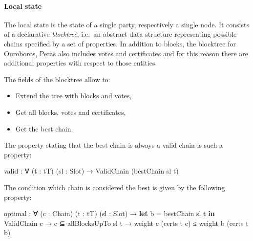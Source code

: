 \documentclass[10pt]{article}
\newenvironment{Shaded}{}{}
\newcommand{\KeywordTok}[1]{\textcolor[rgb]{0.00,0.44,0.13}{\textbf{#1}}}
\newcommand{\NormalTok}[1]{#1}
\newcommand{\OtherTok}[1]{\textcolor[rgb]{0.00,0.44,0.13}{#1}}
\providecommand{\tightlist}{%
  \setlength{\itemsep}{0pt}\setlength{\parskip}{0pt}}
\begin{document}
\paragraph{Local state}\label{local-state}

The local state is the state of a single party, respectively a single
node. It consists of a declarative \emph{blocktree}, i.e.~an abstract
data structure representing possible chains specified by a set of
properties. In addition to blocks, the blocktree for Ouroboros, Peras
also includes votes and certificates and for this reason there are
additional properties with respect to those entities.

The fields of the blocktree allow to:

\begin{itemize}
\tightlist
\item
  Extend the tree with blocks and votes,
\item
  Get all blocks, votes and certificates,
\item
  Get the best chain.
\end{itemize}

The property stating that the best chain is always a valid chain is such
a property:

\begin{Shaded}
\begin{Highlighting}[]
\NormalTok{valid }\OtherTok{:} \OtherTok{∀} \OtherTok{(}\NormalTok{t }\OtherTok{:}\NormalTok{ tT}\OtherTok{)} \OtherTok{(}\NormalTok{sl }\OtherTok{:}\NormalTok{ Slot}\OtherTok{)}
  \OtherTok{→}\NormalTok{ ValidChain }\OtherTok{(}\NormalTok{bestChain sl t}\OtherTok{)}
\end{Highlighting}
\end{Shaded}

The condition which chain is considered the best is given by the
following property:

\begin{Shaded}
\begin{Highlighting}[]
\NormalTok{optimal }\OtherTok{:} \OtherTok{∀} \OtherTok{(}\NormalTok{c }\OtherTok{:}\NormalTok{ Chain}\OtherTok{)} \OtherTok{(}\NormalTok{t }\OtherTok{:}\NormalTok{ tT}\OtherTok{)} \OtherTok{(}\NormalTok{sl }\OtherTok{:}\NormalTok{ Slot}\OtherTok{)}
  \OtherTok{→} \KeywordTok{let}\NormalTok{ b }\OtherTok{=}\NormalTok{ bestChain sl t}
    \KeywordTok{in}
\NormalTok{    ValidChain c}
  \OtherTok{→}\NormalTok{ c ⊆ allBlocksUpTo sl t}
  \OtherTok{→}\NormalTok{ weight c }\OtherTok{(}\NormalTok{certs t c}\OtherTok{)}\NormalTok{ ≤ weight b }\OtherTok{(}\NormalTok{certs t b}\OtherTok{)}
\end{Highlighting}
\end{Shaded}
\end{document}
